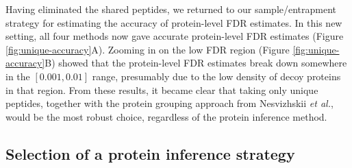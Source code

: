 \documentclass{article}
\begin{document}
Having eliminated the shared peptides, we returned to our
sample/entrapment strategy for estimating the accuracy of
protein-level FDR estimates.  In this new setting, all four methods
now gave accurate protein-level FDR estimates (Figure
\ref{fig:unique-accuracy}A).  Zooming in on the low FDR region (Figure
\ref{fig:unique-accuracy}B) showed that the protein-level FDR
estimates break down somewhere in the $[0.001, 0.01]$ range,
presumably due to the low density of decoy proteins in that region.
From these results, it became clear that taking only unique peptides,
together with the protein grouping approach from Nesvizhskii {\em et
  al.}, would be the most robust choice, regardless of the protein
inference method.


\subsection*{Selection of a protein inference strategy}

\end{document}
